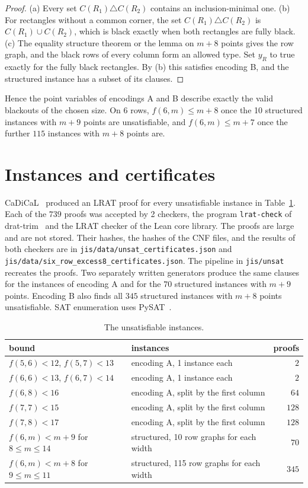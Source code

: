 \documentclass[11pt]{article}
\begin{document}
\begin{proof}
(a) Every set $C(R_1)\triangle C(R_2)$ contains an inclusion-minimal one. (b) For rectangles
without a common corner, the set $C(R_1)\triangle C(R_2)$ is $C(R_1)\cup C(R_2)$, which is
black exactly when both rectangles are fully black. (c) The equality structure theorem or
the lemma on $m+8$ points gives the row graph, and the black rows of every column form an
allowed type. Set $y_R$ to true exactly for the fully black rectangles. By (b) this
satisfies encoding B, and the structured instance has a subset of its clauses.
\end{proof}

Hence the point variables of encodings A and B describe exactly the valid blackouts of the
chosen size. On 6 rows, $f(6,m)\le m+8$ once the 10 structured instances with $m+9$ points
are unsatisfiable, and $f(6,m)\le m+7$ once the further $115$ instances with $m+8$ points
are.

\section{Instances and certificates}

CaDiCaL~\cite{cadical} produced an LRAT proof for every unsatisfiable instance in
Table~\ref{tab:instances}. Each of the $739$ proofs was accepted by 2 checkers, the program
\texttt{lrat-check} of drat-trim~\cite{drattrim,cruzfilipe} and the LRAT checker of the
Lean core library. The proofs are large and are not stored. Their hashes, the hashes of
the CNF files, and the results of both checkers are in
\nolinkurl{jis/data/unsat_certificates.json} and
\nolinkurl{jis/data/six_row_excess8_certificates.json}. The pipeline in
\nolinkurl{jis/unsat} recreates the proofs. Two separately written generators produce the
same clauses for the instances of encoding A and for the $70$ structured instances with
$m+9$ points. Encoding B also finds all $345$ structured instances with $m+8$ points
unsatisfiable. SAT enumeration uses PySAT~\cite{pysat}.

\begin{table}[ht]
\centering
\small\begin{tabular}{@{}llr@{}}
\toprule
bound & instances & proofs\\
\midrule
$f(5,6)<12$, $f(5,7)<13$ & encoding A, 1 instance each & $2$\\
$f(6,6)<13$, $f(6,7)<14$ & encoding A, 1 instance each & $2$\\
$f(6,8)<16$ & encoding A, split by the first column & $64$\\
$f(7,7)<15$ & encoding A, split by the first column & $128$\\
$f(7,8)<17$ & encoding A, split by the first column & $128$\\
$f(6,m)<m+9$ for $8\le m\le14$ & structured, 10 row graphs for each width & $70$\\
$f(6,m)<m+8$ for $9\le m\le11$ & structured, 115 row graphs for each width & $345$\\
\bottomrule
\end{tabular}
\caption{The unsatisfiable instances.}
\label{tab:instances}
\end{table}
\end{document}
